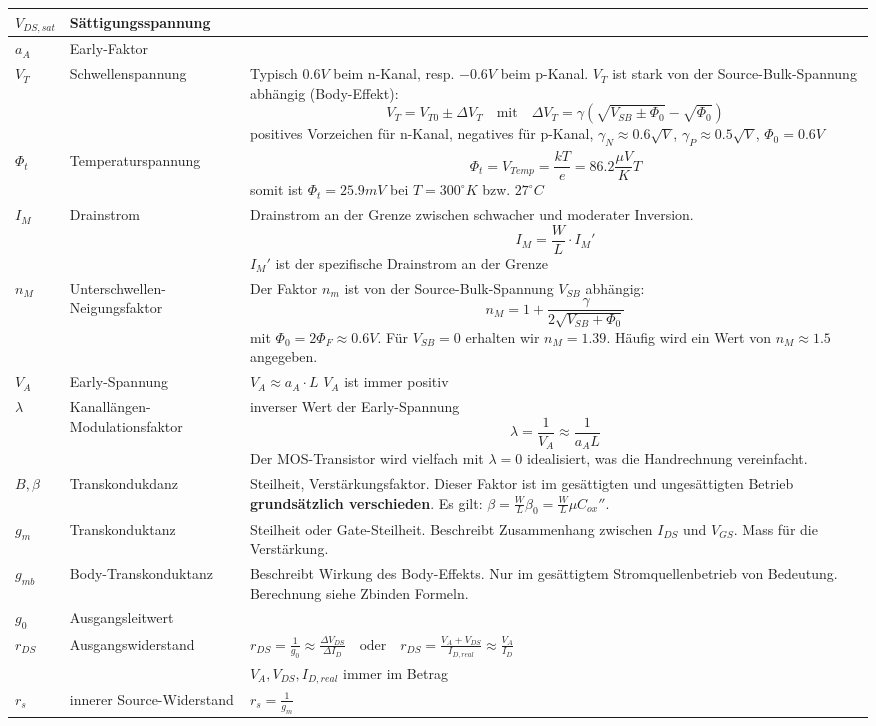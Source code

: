 \begin{tabularx}{\linewidth}{|l|l|X|}
	\hline
		$V_{DS,sat}$	& Sättigungsspannung	&
	\\ \hline
		$a_A$			& Early-Faktor			&
	\\ \hline
		$V_T$ & Schwellenspannung &
		Typisch $0.6V$ beim n-Kanal, resp. $-0.6V$ beim p-Kanal. $V_T$ ist stark von der Source-Bulk-Spannung abhängig (Body-Effekt):
		\[ 
			V_T = V_{T0} \pm \Delta V_T \quad \text{mit} \quad \Delta V_T = \gamma(\sqrt{V_{SB} \pm \Phi_0} -\sqrt{\Phi_0})
		\]
		positives Vorzeichen für n-Kanal, negatives für p-Kanal, $\gamma_N \approx 0.6\sqrt{V}$, $\gamma_P \approx 0.5\sqrt{V}$, $\Phi_{0} = 0.6V$ 
	\\ \hline
		$\Phi_t$ & Temperaturspannung &
		\[
			\Phi_t = V_{Temp} = \frac{kT}{e} = 86.2 \frac{\mu V}{K}T
		\]
		somit ist $\Phi_t = 25.9mV$ bei $T=300^\circ K$ bzw. $27^\circ C$
	\\ \hline
		$I_M$ & Drainstrom &
		Drainstrom an der Grenze zwischen schwacher und moderater Inversion.
		\[
			I_M = \frac{W}{L} \cdot I_M'
		\]
		$I_M'$ ist der spezifische Drainstrom an der Grenze
	\\ \hline
		$n_M$ & Unterschwellen-Neigungsfaktor &
		Der Faktor $n_m$ ist von der Source-Bulk-Spannung $V_{SB}$ abhängig:
		\[
			n_M = 1 + \frac{\gamma}{2 \sqrt{V_{SB} + \Phi_0}}
		\]
		mit $\Phi_0 = 2 \Phi_F \approx 0.6V$. 
		Für $V_{SB} = 0$ erhalten wir $n_M=1.39$. Häufig wird ein Wert von $n_M \approx 1.5$ angegeben.
	\\ \hline
		$V_A$			& Early-Spannung		& $V_A \approx a_A \cdot L$ \quad $V_{A}$ ist immer positiv
	\\ \hline
		$\lambda$ & Kanallängen-Modulationsfaktor &
		inverser Wert der Early-Spannung
		\[
			\lambda = \frac{1}{V_A} \approx \frac{1}{a_A L}
		\]
		Der MOS-Transistor wird vielfach mit $\lambda = 0$ idealisiert, was die Handrechnung vereinfacht.
	\\ \hline
		$B, \beta$ & Transkondukdanz &
		Steilheit, Verstärkungsfaktor. Dieser Faktor ist im gesättigten und ungesättigten Betrieb \textbf{grundsätzlich verschieden}. Es gilt: $\beta = \frac{W}{L} \beta_0 = \frac{W}{L} \mu C_{ox}''$. 
	\\ \hline
		$g_{m}$	& Transkonduktanz & Steilheit oder Gate-Steilheit. Beschreibt Zusammenhang zwischen $I_{DS}$ und $V_{GS}$. Mass für die Verstärkung.
	\\ \hline
		$g_{mb}$ & Body-Transkonduktanz & Beschreibt Wirkung des Body-Effekts. Nur im gesättigtem Stromquellenbetrieb von Bedeutung. Berechnung siehe Zbinden Formeln.
	\\ \hline
		$g_{0}$ & Ausgangsleitwert &
	\\ \hline
		$r_{DS}$ & Ausgangswiderstand & $r_{DS} = \frac{1}{g_0} \approx \frac{\Delta 	V_{DS}}{\Delta I_D} \quad 
													  \text{oder} \quad r_{DS} = \frac{V_A + V_{DS}}{I_{D,real}} \approx \frac{V_A}{I_D} $ 
	\\				&			&$V_{A}, V_{DS}, I_{D,real}$ immer im Betrag  
	\\ \hline
		$r_{s}$	& innerer Source-Widerstand & $r_{s} = \frac{1}{g_{m}}$
	\\ \hline
\end{tabularx}

